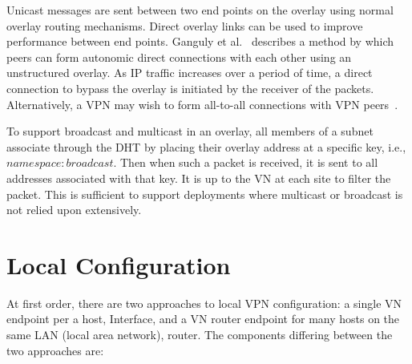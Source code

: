 Unicast messages are sent between two end points on the overlay using normal
overlay routing mechanisms.  Direct overlay links can be used to improve
performance between end points.  Ganguly et al.~\cite{ipop} describes a method
by which peers can form autonomic direct connections with each other using an
unstructured overlay.  As IP traffic increases over a period of time, a direct
connection to bypass the overlay is initiated by the receiver of the packets.
Alternatively, a VPN may wish to form all-to-all connections with VPN
peers~\cite{cops08}.

To support broadcast and multicast in an overlay, all members of a subnet
associate through the DHT by placing their overlay address at a specific key,
i.e., $namespace:broadcast$.  Then when such a packet is received, it is sent
to all addresses associated with that key.  It is up to the VN at each site to
filter the packet.  This is sufficient to support deployments where multicast
or broadcast is not relied upon extensively.  

\section{Local Configuration} At first order, there are two approaches to local
VPN configuration: a single VN endpoint per a host, Interface, and a VN router
endpoint for many hosts on the same LAN (local area network), router.  The
components differing between the two approaches are:


